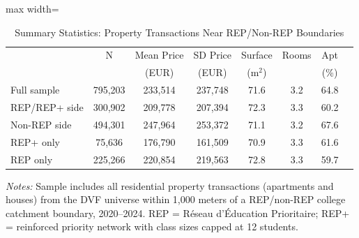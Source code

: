 \begin{table}[htbp]
\centering
\caption{Summary Statistics: Property Transactions Near REP/Non-REP Boundaries}
\label{tab:summary}
\begin{adjustbox}{max width=\textwidth}
\begin{tabular}{lccccccc}
\toprule
 & N & Mean Price & SD Price & Surface & Rooms & Apt \\
 & & (EUR) & (EUR) & (m$^2$) & & (\%) \\
\midrule
Full sample & 795,203 & 233,514 & 237,748 & 71.6 & 3.2 & 64.8 \\
REP/REP+ side & 300,902 & 209,778 & 207,394 & 72.3 & 3.3 & 60.2 \\
Non-REP side & 494,301 & 247,964 & 253,372 & 71.1 & 3.2 & 67.6 \\
REP+ only & 75,636 & 176,790 & 161,509 & 70.9 & 3.3 & 61.6 \\
REP only & 225,266 & 220,854 & 219,563 & 72.8 & 3.3 & 59.7 \\
\bottomrule
\end{tabular}
\end{adjustbox}
\begin{tablenotes}
\small
\item \textit{Notes:} Sample includes all residential property transactions (apartments and houses) from the DVF universe within 1,000 meters of a REP/non-REP college catchment boundary, 2020--2024. REP = R\'{e}seau d'\'{E}ducation Prioritaire; REP+ = reinforced priority network with class sizes capped at 12 students.
\end{tablenotes}
\end{table}
